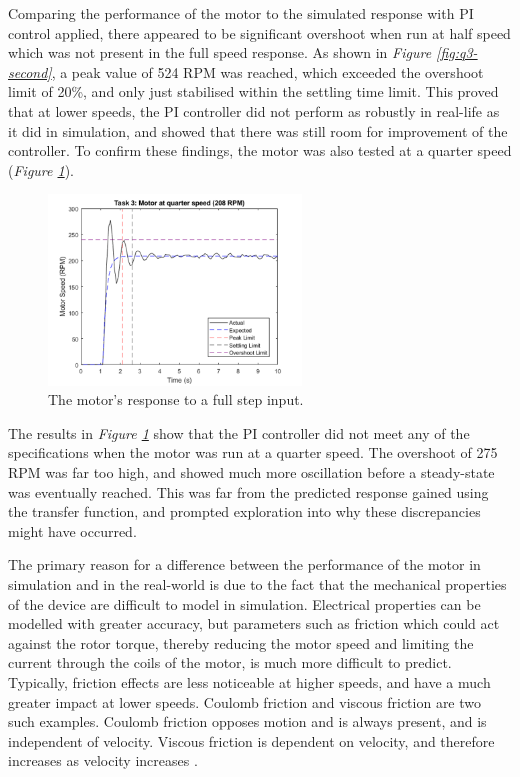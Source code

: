 \documentclass[11pt, onecolumn]{article}
\begin{document}
\par Comparing the performance of the motor to the simulated response with PI control applied, there appeared to be significant overshoot when run at half speed which was not present in the full speed response. As shown in \textit{Figure \ref{fig:q3-second}}, a peak value of 524 RPM was reached, which exceeded the overshoot limit of 20\%, and only just stabilised within the settling time limit. This proved that at lower speeds, the PI controller did not perform as robustly in real-life as it did in simulation, and showed that there was still room for improvement of the controller. To confirm these findings, the motor was also tested at a quarter speed (\textit{Figure \ref{fig:q3-third}}).
\begin{figure}[h!]
    \centering
    \includegraphics[width=0.6\textwidth]{q3-g3.png}
    \caption{The motor's response to a full step input.}
    \label{fig:q3-third}
\end{figure}
\par The results in \textit{Figure \ref{fig:q3-third}} show that the PI controller did not meet any of the specifications when the motor was run at a quarter speed. The overshoot of 275 RPM was far too high, and showed much more oscillation before a steady-state was eventually reached. This was far from the predicted response gained using the transfer function, and prompted exploration into why these discrepancies might have occurred.
\par The primary reason for a difference between the performance of the motor in simulation and in the real-world is due to the fact that the mechanical properties of the device are difficult to model in simulation. Electrical properties can be modelled with greater accuracy, but parameters such as friction which could act against the rotor torque, thereby reducing the motor speed and limiting the current through the coils of the motor, is much more difficult to predict. Typically, friction effects are less noticeable at higher speeds, and have a much greater impact at lower speeds. Coulomb friction and viscous friction are two such examples. Coulomb friction opposes motion and is always present, and is independent of velocity. Viscous friction is dependent on velocity, and therefore increases as velocity increases \cite{Virgala2013}.
\end{document}
